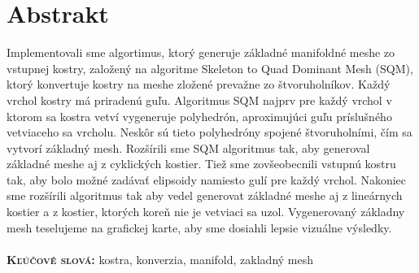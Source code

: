 \chapter{Abstrakt}
Implementovali sme algortimus, ktorý generuje základné manifoldné meshe zo vstupnej kostry, založený na algoritme Skeleton to Quad Dominant Mesh (SQM), ktorý konvertuje kostry na meshe zložené prevažne zo štvoruholníkov.
Každý vrchol kostry má priradenú guľu.
Algoritmus SQM najprv pre každý vrchol v ktorom sa kostra vetví vygeneruje polyhedrón, aproximujúci guľu príslušného vetviaceho sa vrcholu.
Neskôr sú tieto polyhedróny spojené štvoruholními, čím sa vytvorí základný mesh.
Rozšírili sme SQM algoritmus tak, aby generoval základné meshe aj z cyklických kostier.
Tiež sme zovšeobecnili vstupnú kostru tak, aby bolo možné zadávať elipsoidy namiesto gulí pre každý vrchol.
Nakoniec sme rozšírili algoritmus tak aby vedel generovat základné meshe aj z lineárnych kostier a z kostier, ktorých koreň nie je vetviaci sa uzol.
Vygenerovaný základny mesh teselujeme na grafickej karte, aby sme dosiahli lepsie vizuálne výsledky.
\\ \\
\textbf{\textsc{Kľúčové slová:}} kostra, konverzia, manifold, zakladný mesh
